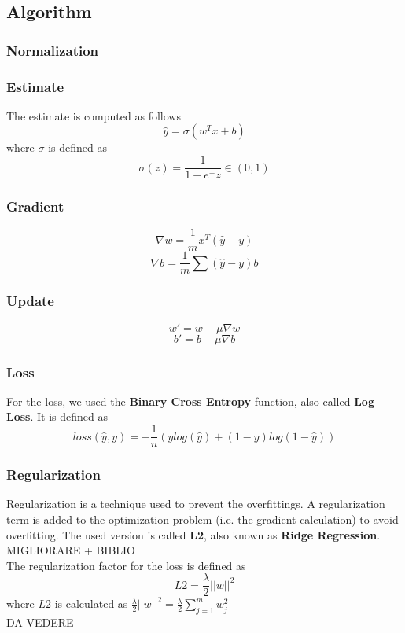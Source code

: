 \documentclass[
	letterpaper, %
	10pt, %
]{class}
\begin{document}
\subsection{Algorithm}

\subsubsection{Normalization}

\subsubsection{Estimate}
The estimate is computed as follows
$$ \hat{y} = \sigma(w^Tx + b) $$
where $\sigma$ is defined as
$$ \sigma(z) = \frac{1}{1 + e^-z} \in (0,1) $$

\subsubsection{Gradient}

$$ \nabla w = \frac{1}{m}x^T(\hat{y} - y) $$
$$\nabla b = \frac{1}{m}\sum(\hat{y} - y) b $$

\subsubsection{Update}


$$ w' = w - \mu \nabla w $$
$$ b' = b - \mu \nabla b $$

\subsubsection{Loss}
For the loss, we used the \textbf{Binary Cross Entropy} function, also called \textbf{Log Loss}.
It is defined as
$$ loss(\hat{y}, y) = -\frac{1}{n}(y log(\hat{y}) + (1-y)log(1-\hat{y})) $$

\subsubsection{Regularization}
Regularization is a technique used to prevent the overfittings. A regularization term is added to the optimization problem (i.e. the gradient calculation) to avoid overfitting.
The used version is called \textbf{L2}, also known as \textbf{Ridge Regression}. MIGLIORARE + BIBLIO\\

The regularization factor for the loss is defined as
$$ L2 = \frac{\lambda}{2}||w||^2 $$
where $L2$ is calculated as $ \frac{\lambda}{2}||w||^2 = \frac{\lambda}2{\displaystyle\sum_{j=1}^m w_j^2} $ \\
DA VEDERE
\end{document}
